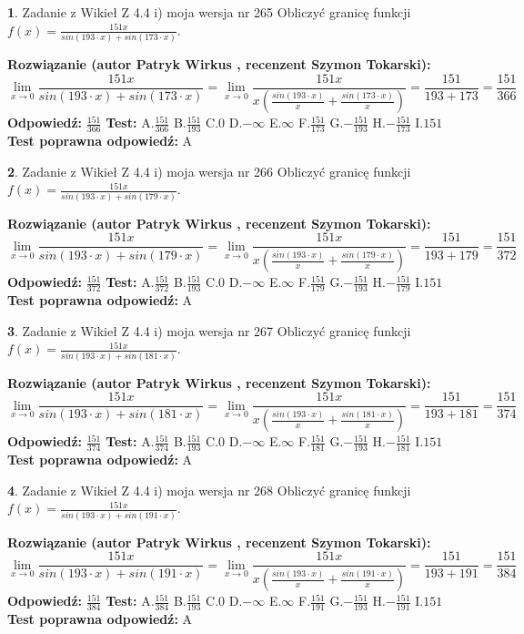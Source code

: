 \documentclass[12pt, a4paper]{article}
\theoremstyle{definition} %
\newtheorem{zad}{}
\newcommand{\zadStart}[1]{\begin{zad}#1\newline}
\newcommand{\zadStop}{\end{zad}}
\newcommand{\rozwStart}[2]{\noindent \textbf{Rozwiązanie (autor #1 , recenzent #2): }\newline}
\newcommand{\rozwStop}{\newline}
\newcommand{\odpStart}{\noindent \textbf{Odpowiedź:}\newline}
\newcommand{\odpStop}{\newline}
\newcommand{\testStart}{\noindent \textbf{Test:}\newline}
\newcommand{\testStop}{\newline}
\newcommand{\kluczStart}{\noindent \textbf{Test poprawna odpowiedź:}\newline}
\newcommand{\kluczStop}{\newline}
\begin{document}
\zadStart{Zadanie z Wikieł Z 4.4 i) moja wersja nr 265}
Obliczyć granicę funkcji $f(x)=\frac{151x}{sin(193\cdot x) +sin(173\cdot x)}$.
\zadStop
\rozwStart{Patryk Wirkus}{Szymon Tokarski}
$$\lim\limits_{x\to 0}\frac{151x}{sin(193\cdot x) +sin(173\cdot x)}=\lim\limits_{x\to 0}\frac{151x}{x(\frac{sin(193\cdot x)}{x}+\frac{sin(173\cdot x)}{x})}=\frac{151}{193+173} = \frac{151}{366}$$
\rozwStop
\odpStart
$\frac{151}{366}$
\odpStop
\testStart
A.$\frac{151}{366}$
B.$\frac{151}{193}$
C.$0$
D.$-\infty$
E.$\infty$
F.$\frac{151}{173}$
G.$-\frac{151}{193}$
H.$-\frac{151}{173}$
I.$151$
\testStop
\kluczStart
A
\kluczStop



\zadStart{Zadanie z Wikieł Z 4.4 i) moja wersja nr 266}
Obliczyć granicę funkcji $f(x)=\frac{151x}{sin(193\cdot x) +sin(179\cdot x)}$.
\zadStop
\rozwStart{Patryk Wirkus}{Szymon Tokarski}
$$\lim\limits_{x\to 0}\frac{151x}{sin(193\cdot x) +sin(179\cdot x)}=\lim\limits_{x\to 0}\frac{151x}{x(\frac{sin(193\cdot x)}{x}+\frac{sin(179\cdot x)}{x})}=\frac{151}{193+179} = \frac{151}{372}$$
\rozwStop
\odpStart
$\frac{151}{372}$
\odpStop
\testStart
A.$\frac{151}{372}$
B.$\frac{151}{193}$
C.$0$
D.$-\infty$
E.$\infty$
F.$\frac{151}{179}$
G.$-\frac{151}{193}$
H.$-\frac{151}{179}$
I.$151$
\testStop
\kluczStart
A
\kluczStop



\zadStart{Zadanie z Wikieł Z 4.4 i) moja wersja nr 267}
Obliczyć granicę funkcji $f(x)=\frac{151x}{sin(193\cdot x) +sin(181\cdot x)}$.
\zadStop
\rozwStart{Patryk Wirkus}{Szymon Tokarski}
$$\lim\limits_{x\to 0}\frac{151x}{sin(193\cdot x) +sin(181\cdot x)}=\lim\limits_{x\to 0}\frac{151x}{x(\frac{sin(193\cdot x)}{x}+\frac{sin(181\cdot x)}{x})}=\frac{151}{193+181} = \frac{151}{374}$$
\rozwStop
\odpStart
$\frac{151}{374}$
\odpStop
\testStart
A.$\frac{151}{374}$
B.$\frac{151}{193}$
C.$0$
D.$-\infty$
E.$\infty$
F.$\frac{151}{181}$
G.$-\frac{151}{193}$
H.$-\frac{151}{181}$
I.$151$
\testStop
\kluczStart
A
\kluczStop



\zadStart{Zadanie z Wikieł Z 4.4 i) moja wersja nr 268}
Obliczyć granicę funkcji $f(x)=\frac{151x}{sin(193\cdot x) +sin(191\cdot x)}$.
\zadStop
\rozwStart{Patryk Wirkus}{Szymon Tokarski}
$$\lim\limits_{x\to 0}\frac{151x}{sin(193\cdot x) +sin(191\cdot x)}=\lim\limits_{x\to 0}\frac{151x}{x(\frac{sin(193\cdot x)}{x}+\frac{sin(191\cdot x)}{x})}=\frac{151}{193+191} = \frac{151}{384}$$
\rozwStop
\odpStart
$\frac{151}{384}$
\odpStop
\testStart
A.$\frac{151}{384}$
B.$\frac{151}{193}$
C.$0$
D.$-\infty$
E.$\infty$
F.$\frac{151}{191}$
G.$-\frac{151}{193}$
H.$-\frac{151}{191}$
I.$151$
\testStop
\kluczStart
A
\kluczStop
\end{document}
